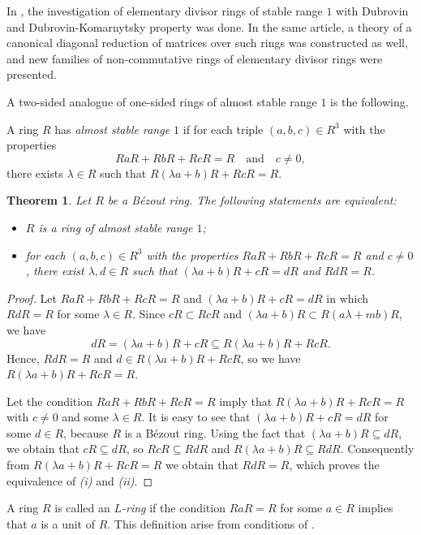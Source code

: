 \documentclass[10pt,a4paper]{amsart}
\theoremstyle{plain}
\newtheorem{theorem}{Theorem}
\theoremstyle{definition}
\begin{document}
In \cite{Bovdi_Zabavsky_2}, the investigation of elementary divisor rings of stable range $1$ with Dubrovin and
Dubrovin-Komarnytsky property was done.
In the same article, a theory of a canonical diagonal reduction of matrices over such rings was  constructed as well,  and new families of non-commutative rings of elementary divisor rings  were  presented.



A two-sided analogue of one-sided rings of almost stable range $1$ is the following.

A  ring $R$ has {\it almost stable range $1$} if for each triple $(a,b,c)\in R^3$ with the properties
\[
RaR+RbR+RcR=R \quad \text{and}\quad c\ne 0,
\]
there exists $\lambda\in R$ such that $R(\lambda a+b)R+RcR=R$.


\begin{theorem}\label{T:8}
Let $R$ be a B\'ezout ring. The following statements are equivalent:
\begin{itemize}
\item[(i)]$R$ is a ring of almost stable range $1$;
\item[(ii)] for each $(a,b,c)\in R^3$ with the properties   $RaR+RbR+RcR=R$ and  $c\ne0$, there exist $\lambda,d\in R$ such that
$(\lambda a + b)R + cR = dR$ and $RdR = R$.
\end{itemize}
\end{theorem}

\begin{proof}
Let $RaR+RbR+RcR=R$ and $(\lambda a +b)R+cR=dR$ in which  $RdR=R$ for some $\lambda\in R$.
Since $cR\subset RcR$ and $(\lambda a +b)R\subset R(a\lambda +mb)R$, we have
\[
dR=(\lambda a+b)R+cR\subseteq R(\lambda a+b)R+RcR.
\]
Hence, $RdR=R$ and $d\in R(\lambda a +b)R+RcR$, so  we have $R(\lambda a +b)R+RcR=R$.

Let the condition $RaR+RbR+RcR=R$ imply  that $R(\lambda a +b)R+RcR=R$ with  $c\ne0$  and  some $\lambda\in R$. It is easy to see that $(\lambda a +b)R+cR=dR$ for some $d\in R$,  because $R$ is a B\'ezout ring. Using the fact that  $(\lambda a +b)R\subseteq dR$, we obtain that $cR\subseteq dR$, so  $RcR\subseteq RdR$ and $R(\lambda a +b)R\subseteq RdR$. Consequently  from  $R(\lambda a +b)R+RcR=R$ we obtain that $RdR=R$, which
proves the equivalence of \textsl{(i)} and \textsl{(ii)}.
\end{proof}

A ring $R$ is called an {\it $L$-ring}      if the condition $RaR=R$ for some  $a\in R$ implies that  $a$ is a unit of $R$. This definition arise from   conditions of \cite[Proposition 7.3(2)]{19-lamdugas}.
\end{document}
